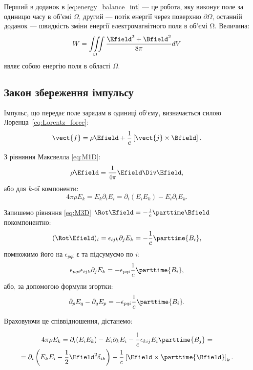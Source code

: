 Перший в доданок в \eqref{eq:energy_balance_int} --- це робота, яку виконує поле за одиницю часу
в об’ємі $\Omega$, другий --- потік енергії через поверхню $\partial\Omega$, останній доданок ---
швидкість зміни енергії електромагнітного поля в об’ємі Ω. Величина:
\begin{equation}
    W = \iiint\limits_{\Omega}     \frac{\Efield^2 + \Bfield^2}{8\pi} dV
\end{equation}
являє собою енергію поля в області $\Omega$.


\subsection*{Закон збереження імпульсу}

Імпульс, що передає поле зарядам в одиниці об`єму, визначається силою
Лоренца~\eqref{eq:Lorentz_force}:
\begin{equation*}
    \vect{f} = \rho\Efield + \frac1c\left[\vect{j}\times\Bfield\right].
\end{equation*}

З рівняння Максвелла \eqref{eq:M1D}:
\begin{equation*}
    \rho\Efield = \frac1{4\pi}\Efield\Div\Efield,
\end{equation*}
або для $k$-ої компоненти:
\begin{equation*}
    4\pi\rho E_k = E_k\partial_iE_i = \partial_i(E_iE_k) - E_i \partial_iE_k.
\end{equation*}

Запишемо рівняння \eqref{eq:M3D} $\Rot\Efield = - \frac1c \parttime\Bfield$ покомпонентно:
\begin{equation*}
    (\Rot\Efield)_i = \epsilon_{ijk}\partial_j E_k = - \frac1c \parttime{B_i},
\end{equation*}
помножимо його на $\epsilon_{pqi}$ ε та підсумуємо по $i$:
\begin{equation*}
    \epsilon_{pqi}\epsilon_{ijk}\partial_j E_k = - \epsilon_{pqi}  \frac1c \parttime{B_i},
\end{equation*}
або, за допомогою формули згортки:
\begin{equation*}
    \partial_pE_q -  \partial_qE_p = - \epsilon_{pqi}  \frac1c \parttime{B_i}.
\end{equation*}

Враховуючи це співвідношення, дістанемо:

\begin{multline*}
     4\pi\rho E_k =  \partial_i(E_iE_k) - E_i \partial_kE_i - \frac1c \epsilon_{kij} E_i \parttime{B_j} = \\
    = \partial_i\left( E_kE_i - \frac12
     \Efield^2\delta_{ik}\right) - \frac1c \left[ \Efield \times \parttime{\Bfield}\right]_k .
\end{multline*}

